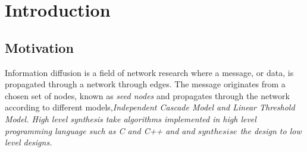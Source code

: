 \chapter{Introduction} \label{intro}

\section{Motivation}
Information diffusion is a field of network research where a message, or data, is propagated through a network through edges. The message originates from a chosen set of nodes, known as \textit{seed nodes} and propagates through the network according to different models,\it{Independent Cascade Model} and \it{Linear Threshold Model}.  
High level synthesis take algorithms implemented in high level programming language such as C and C++ and and $synthesise$ the design to low level designs\citep{52214}. 